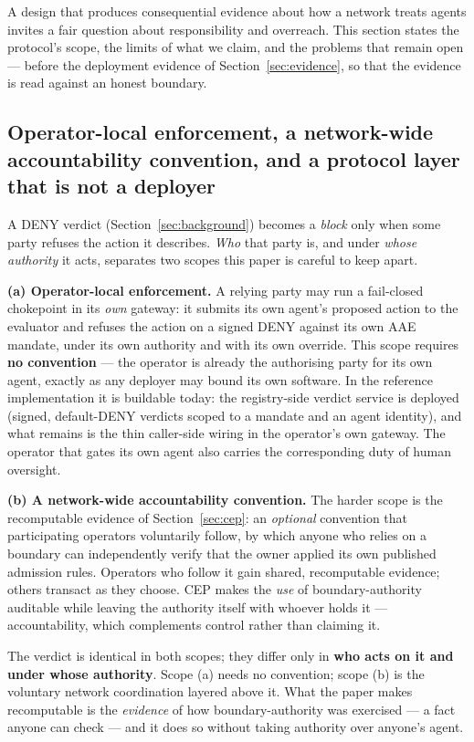 A design that produces consequential evidence about how a network treats agents invites a fair question about responsibility and overreach. This section states the protocol's scope, the limits of what we claim, and the problems that remain open — before the deployment evidence of Section~\ref{sec:evidence}, so that the evidence is read against an honest boundary.

\subsection{Operator-local enforcement, a network-wide accountability convention, and a protocol layer that is not a deployer}
\label{subsec:protocol-not-deployer}

A DENY verdict (Section~\ref{sec:background}) becomes a \emph{block} only when some party refuses the action it describes. \emph{Who} that party is, and under \emph{whose authority} it acts, separates two scopes this paper is careful to keep apart.

\textbf{(a) Operator-local enforcement.} A relying party may run a fail-closed chokepoint in its \emph{own} gateway: it submits its own agent's proposed action to the evaluator and refuses the action on a signed DENY against its own AAE mandate, under its own authority and with its own override. This scope requires \textbf{no convention} — the operator is already the authorising party for its own agent, exactly as any deployer may bound its own software. In the reference implementation it is buildable today: the registry-side verdict service is deployed (signed, default-DENY verdicts scoped to a mandate and an agent identity), and what remains is the thin caller-side wiring in the operator's own gateway. The operator that gates its own agent also carries the corresponding duty of human oversight.

\textbf{(b) A network-wide accountability convention.} The harder scope is the recomputable evidence of Section~\ref{sec:cep}: an \emph{optional} convention that participating operators voluntarily follow, by which anyone who relies on a boundary can independently verify that the owner applied its own published admission rules. Operators who follow it gain shared, recomputable evidence; others transact as they choose. CEP makes the \emph{use} of boundary-authority auditable while leaving the authority itself with whoever holds it — accountability, which complements control rather than claiming it.

The verdict is identical in both scopes; they differ only in \textbf{who acts on it and under whose authority}. Scope (a) needs no convention; scope (b) is the voluntary network coordination layered above it. What the paper makes recomputable is the \emph{evidence} of how boundary-authority was exercised — a fact anyone can check — and it does so without taking authority over anyone's agent.

